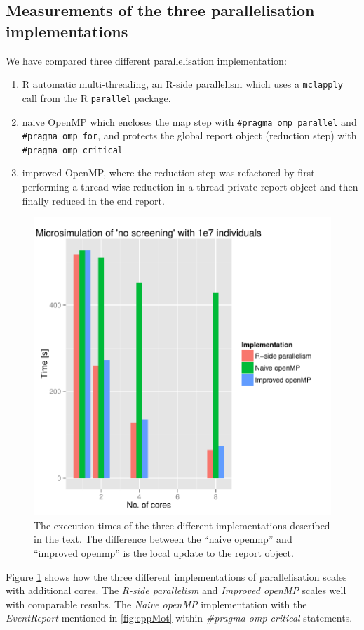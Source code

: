 \subsection{Measurements of the three parallelisation implementations}

We have compared three different parallelisation implementation: 
\begin{enumerate}
\item R automatic multi-threading, an R-side parallelism which uses a \texttt{mclapply} call from the R
  \texttt{parallel} package.
\item naive OpenMP which encloses the map step with \texttt{\#pragma
    omp parallel} and \texttt{\#pragma omp for}, and protects the
  global report object (reduction step) with \texttt{\#pragma omp
    critical}
\item improved OpenMP, where the reduction step was refactored by
  first performing a thread-wise reduction in a thread-private report
  object and then finally reduced in the end report.
\end{enumerate}
\begin{figure}[!htbp] \centering
  \includegraphics[height=0.5\textheight]{images/implementationProfiling.pdf}
  \caption{The execution times of the three different implementations
    described in the text. The difference between the ``naive openmp''
  and ``improved openmp'' is the local update to the report
  object.}
  \label{fig:implScaling}
\end{figure} 
Figure \ref{fig:implScaling} shows how the three
different implementations of parallelisation scales with additional
cores. The \emph{R-side parallelism} and \emph{Improved openMP} scales
well with comparable results. The \emph{Naive openMP} implementation
with the \emph{EventReport} mentioned in \ref{fig:cppMot} within
\emph{\#pragma omp critical} statements. 

